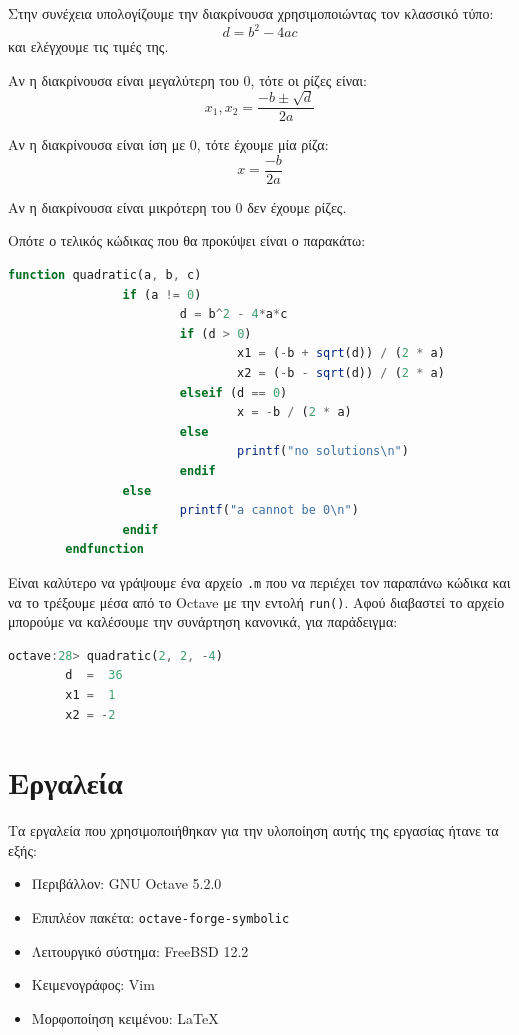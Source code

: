 \documentclass{article}
\begin{document}
Στην συνέχεια υπολογίζουμε την διακρίνουσα χρησιμοποιώντας τον κλασσικό τύπο:
\[d = b^2 - 4ac\]
και ελέγχουμε τις τιμές της.

Αν η διακρίνουσα είναι μεγαλύτερη του 0, τότε οι ρίζες είναι:
\[x_1, x_2 = \frac{-b \pm \sqrt d}{2a}\]

Αν η διακρίνουσα είναι ίση με 0, τότε έχουμε μία ρίζα:
\[x = \frac{-b}{2a}\]

Αν η διακρίνουσα είναι μικρότερη του 0 δεν έχουμε ρίζες.

Οπότε ο τελικός κώδικας που θα προκύψει είναι ο παρακάτω:

\begin{lstlisting}[language=octave]
        function quadratic(a, b, c)
                if (a != 0)
                        d = b^2 - 4*a*c
                        if (d > 0)
                                x1 = (-b + sqrt(d)) / (2 * a)
                                x2 = (-b - sqrt(d)) / (2 * a)
                        elseif (d == 0)
                                x = -b / (2 * a)
                        else
                                printf("no solutions\n")
                        endif
                else
                        printf("a cannot be 0\n")
                endif
        endfunction
\end{lstlisting}

Είναι καλύτερο να γράψουμε ένα αρχείο \lstinline{.m} που να
περιέχει τον παραπάνω κώδικα και να το τρέξουμε μέσα από
το Octave με την εντολή \lstinline{run()}. Αφού διαβαστεί το
αρχείο μπορούμε να καλέσουμε την συνάρτηση κανονικά, για
παράδειγμα:

\begin{lstlisting}[language=octave]
        octave:28> quadratic(2, 2, -4)
        d  =  36
        x1 =  1
        x2 = -2
\end{lstlisting}

\pagebreak
\section{Εργαλεία}
Τα εργαλεία που χρησιμοποιήθηκαν για την υλοποίηση αυτής της εργασίας ήτανε
τα εξής:

\begin{itemize}
        \item Περιβάλλον: GNU Octave 5.2.0
        \item Επιπλέον πακέτα: \lstinline{octave-forge-symbolic}
        \item Λειτουργικό σύστημα: FreeBSD 12.2
        \item Κειμενογράφος: Vim
        \item Μορφοποίηση κειμένου: \LaTeX
\end{itemize}
\end{document}
